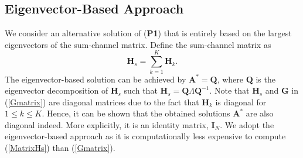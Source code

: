 \documentclass[journal]{IEEEtran}
\theoremstyle{definition}
\begin{document}
	
 \subsection{Eigenvector-Based Approach}
 \label{EigenVectorBased}
We consider an alternative solution of (\textbf{P1}) that is entirely based on the largest eigenvectors of the sum-channel matrix. Define the sum-channel matrix as \vspace{-0.1cm}
\begin{equation}
    \mathbf{H}_{s} = \sum_{k = 1}^K \mathbf{H}_k .
    \label{MatrixHs}
\end{equation}\vspace{-0.1cm}
The eigenvector-based solution can be achieved by $\mathbf{A}^* = \mathbf{Q}$, where $\mathbf{Q}$ is the eigenvector decomposition of $\mathbf{H}_s$ such that $\mathbf{H}_{s} = \mathbf{Q} \Lambda \mathbf{Q}^{-1}$. Note that $\mathbf{H}_s$ and $\mathbf{G}$ in (\ref{Gmatrix}) are diagonal matrices due to the fact that $\mathbf{H}_k$ is diagonal for $1\leq k \leq K$. Hence, it can be shown that the obtained solutions $\mathbf{A}^*$ are also diagonal indeed. More explicitly, it is an identity matrix, $\mathbf{I}_N$. We adopt the eigenvector-based approach as it is computationally less expensive to compute (\ref{MatrixHs}) than (\ref{Gmatrix}). 
\vspace{-0.1cm}
\end{document}
